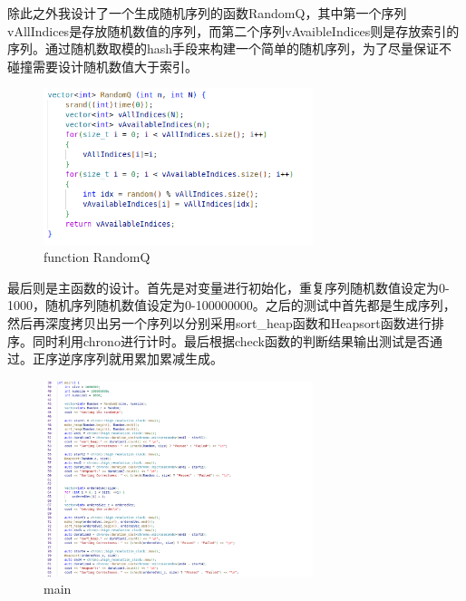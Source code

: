 \documentclass[UTF8]{ctexart}
\begin{document}
	除此之外我设计了一个生成随机序列的函数RandomQ，其中第一个序列vAllIndices是存放随机数值的序列，而第二个序列vAvaibleIndices则是存放索引的序列。通过随机数取模的hash手段来构建一个简单的随机序列，为了尽量保证不碰撞需要设计随机数值大于索引。
	
	
	\begin{figure}[H] %
		\centering %
		\includegraphics[width=0.7\textwidth]{fig3} %
		\caption{function RandomQ} %
	\end{figure}
	
	
	
	最后则是主函数的设计。首先是对变量进行初始化，重复序列随机数值设定为0-1000，随机序列随机数值设定为0-100000000。之后的测试中首先都是生成序列，然后再深度拷贝出另一个序列以分别采用sort\_heap函数和Heapsort函数进行排序。同时利用chrono进行计时。最后根据check函数的判断结果输出测试是否通过。正序逆序序列就用累加累减生成。
	
	\begin{figure}[H] %
		\centering %
		\includegraphics[width=0.7\textwidth]{fig4} %
		\caption{main} %
	\end{figure}
	
\end{document}
